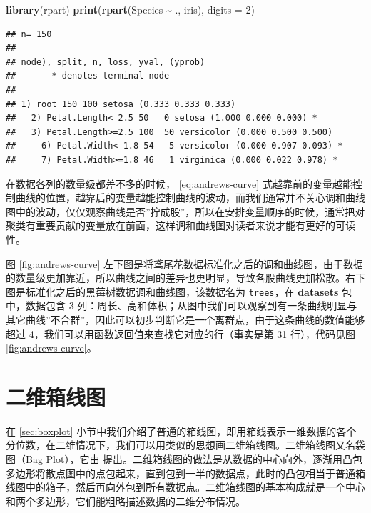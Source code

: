 \documentclass[
  b5paper,
  UTF8,twoside]{book}
\newenvironment{Shaded}{\begin{snugshade}}{\end{snugshade}}
\newcommand{\AttributeTok}[1]{\textcolor[rgb]{0.13,0.29,0.53}{#1}}
\newcommand{\DecValTok}[1]{\textcolor[rgb]{0.00,0.00,0.81}{#1}}
\newcommand{\FunctionTok}[1]{\textcolor[rgb]{0.13,0.29,0.53}{\textbf{#1}}}
\newcommand{\NormalTok}[1]{#1}
\newcommand{\SpecialCharTok}[1]{\textcolor[rgb]{0.81,0.36,0.00}{\textbf{#1}}}
\begin{document}
\begin{Shaded}
\begin{Highlighting}[]
\FunctionTok{library}\NormalTok{(rpart)}
\FunctionTok{print}\NormalTok{(}\FunctionTok{rpart}\NormalTok{(Species }\SpecialCharTok{\textasciitilde{}}\NormalTok{ ., iris), }\AttributeTok{digits =} \DecValTok{2}\NormalTok{)}
\end{Highlighting}
\end{Shaded}

\begin{verbatim}
## n= 150 
## 
## node), split, n, loss, yval, (yprob)
##       * denotes terminal node
## 
## 1) root 150 100 setosa (0.333 0.333 0.333)  
##   2) Petal.Length< 2.5 50   0 setosa (1.000 0.000 0.000) *
##   3) Petal.Length>=2.5 100  50 versicolor (0.000 0.500 0.500)  
##     6) Petal.Width< 1.8 54   5 versicolor (0.000 0.907 0.093) *
##     7) Petal.Width>=1.8 46   1 virginica (0.000 0.022 0.978) *
\end{verbatim}

在数据各列的数量级都差不多的时候， \eqref{eq:andrews-curve} 式越靠前的变量越能控制曲线的位置，越靠后的变量越能控制曲线的波动，而我们通常并不关心调和曲线图中的波动，仅仅观察曲线是否''拧成股''，所以在安排变量顺序的时候，通常把对聚类有重要贡献的变量放在前面，这样调和曲线图对读者来说才能有更好的可读性。

图 \ref{fig:andrews-curve}
左下图是将鸢尾花数据标准化之后的调和曲线图，由于数据的数量级更加靠近，所以曲线之间的差异也更明显，导致各股曲线更加松散。右下图是标准化之后的黑莓树数据调和曲线图，该数据名为 \texttt{trees}，在 \textbf{datasets} 包中，数据包含 3 列：周长、高和体积；从图中我们可以观察到有一条曲线明显与其它曲线''不合群''，因此可以初步判断它是一个离群点，由于这条曲线的数值能够超过 4，我们可以用函数返回值来查找它对应的行（事实是第 31 行），代码见图 \ref{fig:andrews-curve}。

\section{二维箱线图}\label{sec:bagplot}

在 \ref{sec:boxplot} 小节中我们介绍了普通的箱线图，即用箱线表示一维数据的各个分位数，在二维情况下，我们可以用类似的思想画二维箱线图。二维箱线图又名袋图（Bag Plot），它由 \citet{Rousseeuw99} 提出。二维箱线图的做法是从数据的中心向外，逐渐用凸包多边形将散点图中的点包起来，直到包到一半的数据点，此时的凸包相当于普通箱线图中的箱子，然后再向外包到所有数据点。二维箱线图的基本构成就是一个中心和两个多边形，它们能粗略描述数据的二维分布情况。
\end{document}
